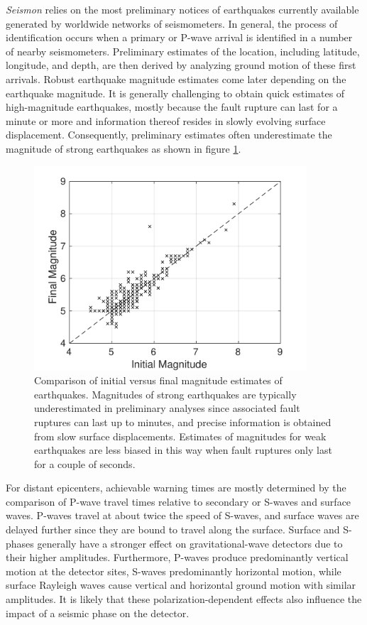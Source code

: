 \documentclass[reprint, prl, aps, showpacs]{revtex4-1}
\begin{document}
\emph{Seismon} relies on the most preliminary notices of earthquakes currently available generated by worldwide networks of seismometers. In general, the process of identification occurs when a primary or P-wave arrival is identified in a number of nearby seismometers. Preliminary estimates of the location, including latitude, longitude, and depth, are then derived by analyzing ground motion of these first arrivals. Robust earthquake magnitude estimates come later depending on the earthquake magnitude. It is generally challenging to obtain quick estimates of high-magnitude earthquakes, mostly because the fault rupture can last for a minute or more and information thereof resides in slowly evolving surface displacement. Consequently, preliminary estimates often underestimate the magnitude of strong earthquakes as shown in figure \ref{fig:initialfinal}.
\begin{figure}[t]
\hspace*{-0.5cm}
\centering
\includegraphics[width=4in]{initial_vs_final_mag.pdf}
\caption{Comparison of initial versus final magnitude estimates of earthquakes. Magnitudes of strong earthquakes are typically underestimated in preliminary analyses since associated fault ruptures can last up to minutes, and precise information is obtained from slow surface displacements. Estimates of magnitudes for weak earthquakes are less biased in this way when fault ruptures only last for a couple of seconds.}
 \label{fig:initialfinal}
 \end{figure}

For distant epicenters, achievable warning times are mostly determined by the comparison of P-wave travel times relative to secondary or S-waves and surface waves. P-waves travel at about twice the speed of S-waves, and surface waves are delayed further since they are bound to travel along the surface. Surface and S-phases generally have a stronger effect on gravitational-wave detectors due to their higher amplitudes. Furthermore, P-waves produce predominantly vertical motion at the detector sites, S-waves predominantly horizontal motion, while surface Rayleigh waves cause vertical and horizontal ground motion with similar amplitudes. It is likely that these polarization-dependent effects also influence the impact of a seismic phase on the detector.
\end{document}

